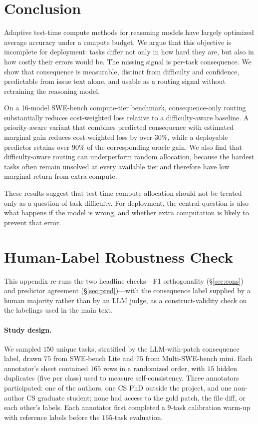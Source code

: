 \documentclass{article}
\begin{document}
\section{Conclusion}

Adaptive test-time compute methods for reasoning models have largely
optimized average accuracy under a compute budget. We argue that this
objective is incomplete for deployment: tasks differ not only in how
hard they are, but also in how costly their errors would be. The
missing signal is per-task consequence. We show that consequence is
measurable, distinct from difficulty and confidence, predictable from
issue text alone, and usable as a routing signal without retraining the
reasoning model.

On a 16-model SWE-bench compute-tier benchmark, consequence-only
routing substantially reduces cost-weighted loss relative to a
difficulty-aware baseline. A priority-aware variant that combines
predicted consequence with estimated marginal gain reduces
cost-weighted loss by over $30\%$, while a deployable predictor
retains over $90\%$ of the corresponding oracle gain. We also find
that difficulty-aware routing can underperform random allocation,
because the hardest tasks often remain unsolved at every available
tier and therefore have low marginal return from extra compute.

These results suggest that test-time compute allocation should not be
treated only as a question of task difficulty. For deployment, the
central question is also what happens if the model is wrong, and
whether extra computation is likely to prevent that error.




\appendix

\section{Human-Label Robustness Check}
\label{app:iaa}

This appendix re-runs the two headline checks---F1 orthogonality
(\S\ref{sec:cons}) and predictor agreement (\S\ref{sec:pred})---with
the consequence label supplied by a human majority rather than by an
LLM judge, as a construct-validity check on the labelings used in the
main text.

\paragraph{Study design.} We sampled $150$ unique tasks, stratified by
the LLM-with-patch consequence label, drawn $75$ from SWE-bench Lite
and $75$ from Multi-SWE-bench mini. Each annotator's sheet contained
$165$ rows in a randomized order, with $15$ hidden duplicates (five
per class) used to measure self-consistency. Three annotators
participated: one of the authors, one CS PhD outside the project, and
one non-author CS graduate student; none had access to the gold patch,
the file diff, or each other's labels. Each annotator first completed
a $9$-task calibration warm-up with reference labels before the
$165$-task evaluation.
\end{document}
